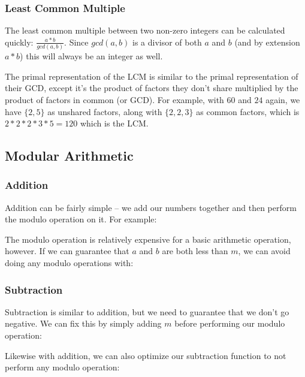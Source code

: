 \subsubsection{Least Common Multiple}

The least common multiple between two non-zero integers can be calculated quickly: $\frac{a * b}{gcd(a, b)}$. Since $gcd(a, b)$ is a divisor of both $a$ and $b$ (and by extension $a * b$) this will always be an integer as well.

The primal representation of the LCM is similar to the primal representation of their GCD, except it's the product of factors they don't share multiplied by the product of factors in common (or GCD). For example, with $60$ and $24$ again, we have $\{2,5\}$ as unshared factors, along with $\{2,2,3\}$ as common factors, which is $2 * 2 * 2 * 3 * 5 = 120$ which is the LCM.

\subsection{Modular Arithmetic}

\subsubsection{Addition}

Addition can be fairly simple -- we add our numbers together and then perform the modulo operation on it. For example:


The modulo operation is relatively expensive for a basic arithmetic operation, however. If we can guarantee that $a$ and $b$ are both less than $m$, we can avoid doing any modulo operations with:


\subsubsection{Subtraction}

Subtraction is similar to addition, but we need to guarantee that we don't go negative. We can fix this by simply adding $m$ before performing our modulo operation:


Likewise with addition, we can also optimize our subtraction function to not perform any modulo operation:


